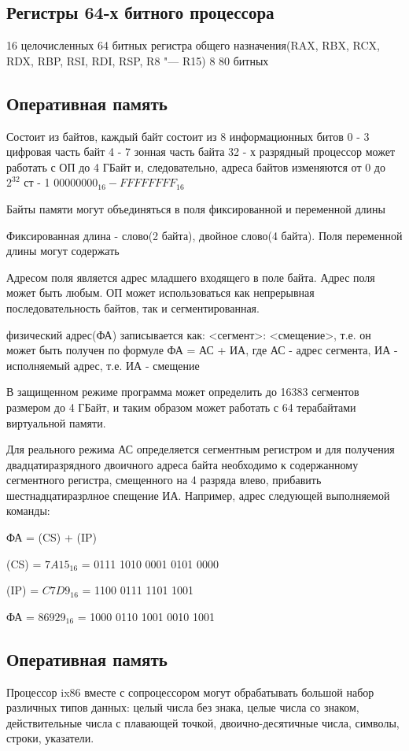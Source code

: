 \subsection{Регистры 64-х битного процессора}
16 целочисленных 64 битных регистра общего назначения(RAX, RBX, RCX, RDX, RBP, RSI, RDI, RSP, R8 "--- R15)
8 80 битных

\subsection{Оперативная память}
Состоит из байтов, каждый байт состоит из 8 информационных битов
0 - 3 цифровая часть байт
4 - 7 зонная часть байта
32 - х разрядный процессор может работать с ОП до 4 ГБайт и, следовательно, адреса байтов изменяются от 0 до $2^{32}$ ст - 1
$00000000_{16} - FFFFFFFF_{16}$

Байты памяти могут объединяться в поля фиксированной и переменной длины

Фиксированная длина - слово(2 байта), двойное слово(4 байта). Поля переменной длины могут содержать 

Адресом поля является адрес младшего входящего в поле байта. Адрес поля может быть любым.
ОП может использоваться как непрерывная последовательность байтов, так и сегментированная.

физический адрес(ФА) записывается как: 
<сегмент>: <смещение>, т.е. он может быть получен по формуле ФА = АС + ИА, где АС - адрес сегмента, ИА - исполняемый адрес, т.е. ИА - смещение 

В защищенном режиме программа может определить до 16383 сегментов размером до 4 ГБайт, и таким образом может работать с 64 терабайтами виртуальной памяти.

Для реального режима АС определяется сегментным регистром и для получения двадцатиразрядного двоичного адреса байта необходимо к содержанному сегментного регистра, смещенного на 4 разряда влево, прибавить шестнадцатиразрлное спещение ИА. Например, адрес следующей выполняемой команды:

ФА = (CS) + (IP)

(CS) = $7A15_{16}$ = 0111 1010 0001 0101 0000

(IP) = $C7D9_{16}$ =      1100 0111 1101 1001

ФА = $86929_{16}$ = 1000 0110 1001 0010 1001

\subsection{Оперативная память}
Процессор ix86 вместе с сопроцессором могут обрабатывать большой набор различных типов данных: целый числа без знака, целые числа со знаком, действительные числа с плавающей точкой, двоично-десятичные числа, символы, строки, указатели.

